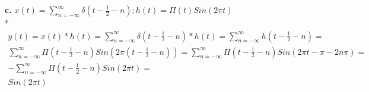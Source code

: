 \documentclass[12pt]{article}
\begin{document}
\textbf{c.}
$x(t) = \sum_{n = -\infty}^{\infty} \delta(t - \frac{1}{2} - n) ; h(t) = \Pi(t)Sin(2\pi t)$\\*
\begin{align*}
	y(t) = x(t) * h(t) = \sum_{n = -\infty}^{\infty} \delta(t - \frac{1}{2} - n) * h(t)	= 
	\sum_{n = -\infty}^{\infty}h(t - \frac{1}{2} - n) = \\
	\sum_{n = -\infty}^{\infty} \Pi(t - \frac{1}{2} - n)Sin(2\pi (t - \frac{1}{2} - n)) = 
	\sum_{n = -\infty}^{\infty} \Pi(t - \frac{1}{2} - n)Sin(2\pi t - \pi - 2 n \pi ) = \\
	-\sum_{n = -\infty}^{\infty} \Pi(t - \frac{1}{2} - n)Sin(2\pi t) = \\
	\boxed{Sin(2\pi t)}
\end{align*}
\end{document}
